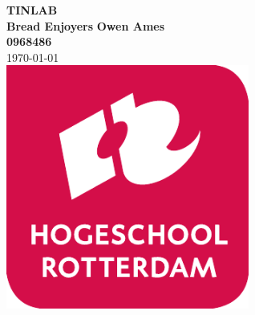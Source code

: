 \sffamily
\begin{titlepage}
  \centering
    \vfill
    {\bfseries\Huge
      TINLAB \\
      }
      \vskip0.5cm
      {\bfseries\large
        Bread Enjoyers
      }
      \vskip1cm
      {\bfseries\Large
        Owen Ames\\
      }
      {\bfseries\small
        0968486\\
      }
      \vskip1cm
        \today\\
    \vfill
    \includegraphics[width=8cm]{assets/logohr.png} %
    \vfill
    \vfill
\end{titlepage}